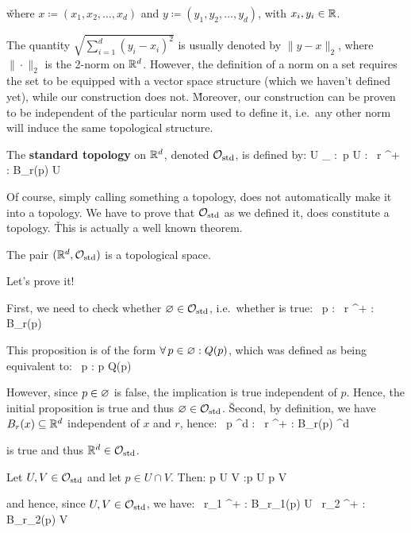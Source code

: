 \v

where $x \coloneqq (x_1,x_2,\ldots,x_d)$ and $y \coloneqq (y_1,y_2,\ldots,y_d)$, with $x_i,y_i\in\mathbb{R}$.
\ed

The quantity $\sqrt{\sum_{i=1}^d (y_i-x_i)^2}$ is usually denoted by $\|y-x\|_2$, where $\|\cdot\|_2$ is the 2-norm
on $\mathbb{R}^d$. However, the definition of a norm on a set requires the set to be equipped with a vector space structure
(which we haven't defined yet), while our construction does not. \v

Moreover, our construction can be proven to be independent of the particular norm used to define it, i.e.\ any other
norm will induce the same topological structure.

The \textbf{standard topology} on $\mathbb{R}^d$, denoted $\mathcal{O}_\mathrm{std}$, is defined by:
\bse
U \in \cO_ :\eqv \forall \, p \in U : \exists \, r \in \R^+ : B_r(p) \se U
\ese
\ed

Of course, simply calling something a topology, does not automatically make it into a topology. We have to prove that
$\mathcal{O}_\mathrm{std}$ as we defined it, does constitute a topology. \v

This is actually a well known theorem.

\bt[]
The pair $(\mathbb{R}^d,\mathcal{O}_\mathrm{std})$ is a topological space.
\et

Let's prove it!

\bq
\ben
\item[i)] First, we need to check whether $\varnothing \in \mathcal{O}_\mathrm{std}$, i.e.\ whether is true:
\bse
\forall \, p \in \vn : \exists \, r \in \R^+ : B_r(p) \se \vn
\ese

This proposition is of the form $\forall \, p \in \varnothing : Q(p)$, which was defined as being equivalent to:
\bse
\forall \, p : p \in \vn \imp Q(p)
\ese

However, since $p\in\varnothing$ is false, the implication is true independent of $p$. Hence, the initial proposition is true
and thus $\varnothing \in \mathcal{O}_\mathrm{std}$. \v

Second, by definition, we have $B_r(x)\subseteq\mathbb{R}^d$ independent of $x$ and $r$, hence:
\bse
\forall \, p \in \R^d : \exists \, r \in \R^+ : B_r(p) \se \R^d
\ese

is true and thus $\mathbb{R}^d\in\mathcal{O}_\mathrm{std}$.
\item[ii)] Let $U,V \in \mathcal{O}_\mathrm{std}$ and let $p \in U \cap V$. Then:
\bse
p \in U \cap V :\eqv p \in U \land p \in V
\ese

and hence, since $U,V \in \mathcal{O}_\mathrm{std}$, we have:
\bse
\exists \, r_1 \in \R^+ : B_{r_1}(p) \se U \quad \land \quad \exists \, r_2 \in \R^+ : B_{r_2}(p) \se V
\ese

